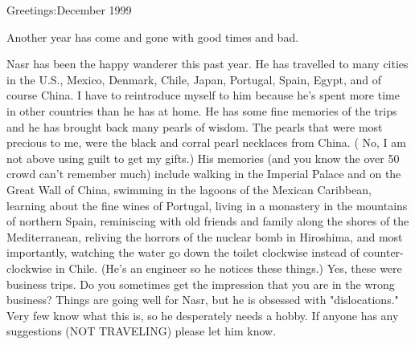 
%

Greetings:\hfill December 1999

Another year has come and gone with good times and bad.

Nasr has been the happy wanderer this past year.  He has travelled to many cities in the U.S., Mexico, Denmark, Chile, Japan, Portugal, Spain,
Egypt, and of course China. I have to reintroduce myself to him because he's spent more time in other countries than he has at home.  He has
some fine memories of the trips and he has brought back many pearls of wisdom.  The pearls that were most precious to me, were the black and
corral pearl necklaces from China.  ( No, I am not above using guilt to get my gifts.)  His memories (and you know the over 50 crowd can't
remember much) include walking in the Imperial Palace and on the Great Wall of China, swimming in the lagoons of the Mexican Caribbean, learning
about the fine wines of Portugal, living in a monastery in the mountains of northern Spain, reminiscing with old friends and family along the
shores of the Mediterranean, reliving the horrors of the nuclear bomb in Hiroshima, and most importantly, watching the water go down the toilet
clockwise instead of counter-clockwise in Chile. (He's an engineer so he notices these things.) Yes, these were business trips.  Do you
sometimes get the impression that you are in the wrong business? Things are going well for Nasr, but he is obsessed with "dislocations."  Very
few know what this is, so he desperately needs a hobby.  If anyone has any suggestions (NOT TRAVELING) please let him know.

